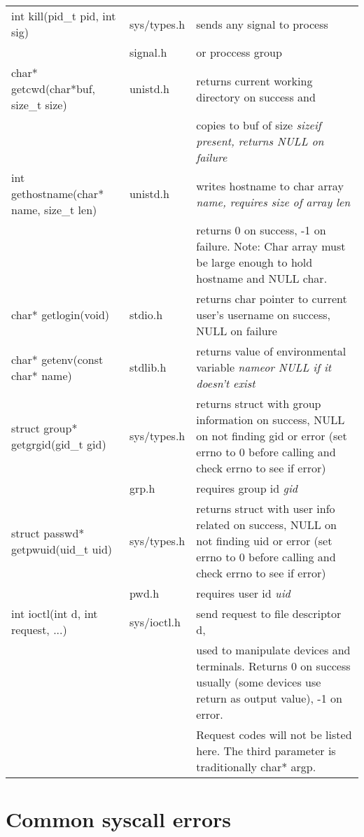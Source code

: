 \documentclass{article}
\begin{document}
\begin{longtable}{p{1.5in} l p{4in}}
    \\ \hline
    int kill(pid\_t pid, int sig) & sys/types.h & sends any signal to process
    \\
    & signal.h & or proccess group
    \\ \hline
    char* getcwd(char*buf, size\_t size)& unistd.h & returns current working directory on success and
    \\
    & & copies to buf of size \it size\rm if present, returns NULL on failure
    \\ \hline
    int gethostname(char* name, size\_t len) & unistd.h & writes hostname to char array \it name\rm, requires size of array \it len\rm
    \\
    & & returns 0 on success, -1 on failure. Note: Char array must be large enough to hold hostname and NULL char.
    \\ \hline
    char* getlogin(void) & stdio.h & returns char pointer to current user's username on success, NULL on failure
    \\ \hline
    char* getenv(const char* name) & stdlib.h & returns value of environmental variable \it name\rm or NULL if it doesn't exist
    \\ \hline
    struct group* getgrgid(gid\_t gid) & sys/types.h & returns struct with group information on success, NULL on not finding gid or error (set errno to 0 before calling and check errno to see if error)
    \\
    &grp.h  &requires group id \it gid\rm
    \\ \hline
    struct passwd* getpwuid(uid\_t uid) & sys/types.h & returns struct with user info related on success, NULL on not finding uid or error (set errno to 0 before calling and check errno to see if error)
    \\
    & pwd.h &requires user id \it uid \rm
    \\ \hline
    int ioctl(int d, int request, ...) & sys/ioctl.h & send request to file descriptor d,
    \\
    & & used to manipulate devices and terminals. Returns 0 on success usually (some devices use return as output value), -1 on error. 
    \\
    & & Request codes will not be listed here. The third parameter is traditionally char* argp.
\end{longtable}

\section{Common syscall errors}
\large \rm
\end{document}

